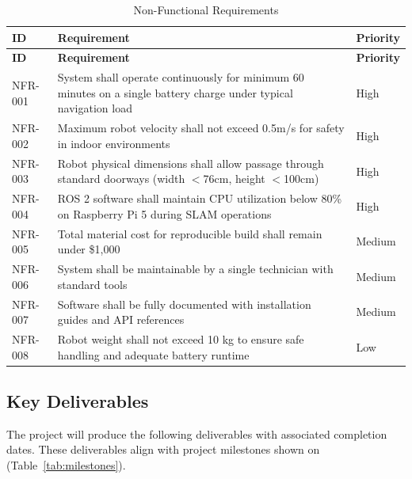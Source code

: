 \begin{longtable}{@{}lp{}l@{}}
\caption{Non-Functional Requirements}
\label{tab:nonfunctional_reqs} \\
\toprule
\textbf{ID} & \textbf{Requirement} & \textbf{Priority} \\
\midrule
\endfirsthead
\toprule
\textbf{ID} & \textbf{Requirement} & \textbf{Priority} \\
\midrule
\endhead
\bottomrule
\endfoot
NFR-001 & System shall operate continuously for minimum 60 minutes on a single battery charge under typical navigation load & High \\
NFR-002 & Maximum robot velocity shall not exceed 0.5m/s for safety in indoor environments & High \\
NFR-003 & Robot physical dimensions shall allow passage through standard doorways (width $<$76cm, height $<$100cm) & High \\
NFR-004 & ROS 2 software shall maintain CPU utilization below 80\% on Raspberry Pi 5 during SLAM operations & High \\
NFR-005 & Total material cost for reproducible build shall remain under \$1,000 & Medium \\
NFR-006 & System shall be maintainable by a single technician with standard tools & Medium \\
NFR-007 & Software shall be fully documented with installation guides and API references & Medium \\
NFR-008 & Robot weight shall not exceed 10 kg to ensure safe handling and adequate battery runtime & Low \\
\end{longtable}

\subsection{Key Deliverables}

The project will produce the following deliverables with associated completion dates. These deliverables align with project milestones shown on  (Table~\ref{tab:milestones}).

